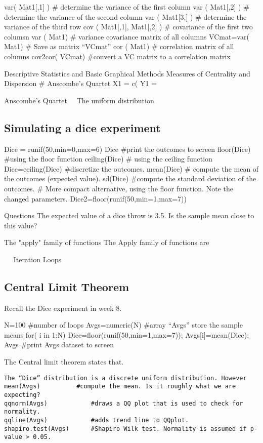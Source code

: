 var( Mat1[,1] )			# determine the variance of the first column 
var ( Mat1[,2] )			# determine the variance of the second column
var ( Mat1[3,] )			# determine the variance of the third row
cov ( Mat1[,1], Mat1[,2] )	# covariance of the first two columsn
var ( Mat1)			# variance covariance matrix of all columns
VCmat=var( Mat1)		# Save as matrix “VCmat”
cor ( Mat1)			# correlation matrix of all columns
cov2cor( VCmat)		#convert a VC matrix to a correlation matrix

 
Descriptive Statistics and Basic Graphical Methods
Measures of Centrality and Dispersion
# Anscombe’s  Quartet
X1 = c(
Y1 =
 

Anscombe’s Quartet 
The uniform distribution

\subsection{Simulating a dice experiment}
Dice = runif(50,min=0,max=6)	
Dice				#print the outcomes to screen
floor(Dice)			#using the floor function
ceiling(Dice)			# using the ceiling function
Dice=ceiling(Dice)		#discretize the outcomes.
mean(Dice)			# compute the mean of the outcomes (expected value).
sd(Dice)			#compute the standard deviation of the outcomes.
# More compact alternative, using the floor function. Note the changed parameters.
Dice2=floor(runif(50,min=1,max=7))	

Questions
The expected value of a dice throw is 3.5. Is the sample mean close to this value?

The "apply" family of functions
 The Apply family of functions are 


 
Iteration Loops
\subsection*{Central Limit Theorem}
Recall the Dice experiment in week 8.

N=100				#number of loops
Avgs=numeric(N)		#array “Avgs” store the sample means
for( i in 1:N)
	{	Dice=floor(runif(50,min=1,max=7));	Avgs[i]=mean(Dice);
	}
Avgs				#print Avgs dataset to screen

The Central limit theorem states that.
\begin{verbatim}
The “Dice” distribution is a discrete uniform distribution. However 
mean(Avgs)			#compute the mean. Is it roughly what we are expecting?
qqnorm(Avgs)			#draws a QQ plot that is used to check for normality.
qqline(Avgs)			#adds trend line to QQplot.
shapiro.test(Avgs)		#Shapiro Wilk test. Normality is assumed if p-value > 0.05.
\end{verbatim}
			
